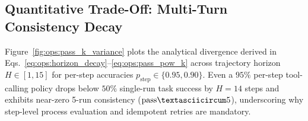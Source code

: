 \documentclass[../../../../master.tex]{subfiles}
\begin{document}

\subsection{Quantitative Trade-Off: Multi-Turn Consistency Decay}
\label{sec:ops:pgfplots_decay}

Figure~\ref{fig:ops:pass_k_variance} plots the analytical divergence derived in Eqs.~\eqref{eq:ops:horizon_decay}--\eqref{eq:ops:pass_pow_k} across trajectory horizon $H \in [1, 15]$ for per-step accuracies $p_{\mathrm{step}} \in \{0.95, 0.90\}$. Even a $95\%$ per-step tool-calling policy drops below $50\%$ single-run task success by $H=14$ steps and exhibits near-zero 5-run consistency ($\mathrm{pass\textasciicircum}5$), underscoring why step-level process evaluation and idempotent retries are mandatory.
\end{document}
